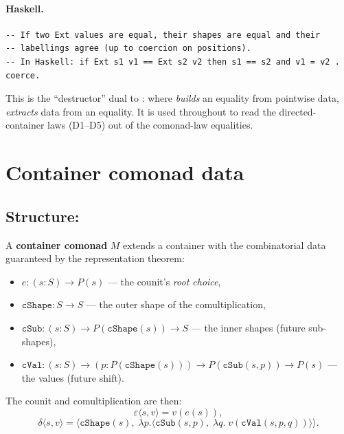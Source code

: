 \documentclass[11pt,a4paper]{article}
\begin{document}
\paragraph{Haskell.}
\begin{lstlisting}[style=haskell]
-- If two Ext values are equal, their shapes are equal and their
-- labellings agree (up to coercion on positions).
-- In Haskell: if Ext s1 v1 == Ext s2 v2 then s1 == s2 and v1 = v2 . coerce.
\end{lstlisting}

\begin{fidelitynote}
This is the ``destructor'' dual to : where 
\emph{builds} an equality from pointwise data,  \emph{extracts}
data from an equality.  It is used throughout to read the directed-container
laws (D1--D5) out of the comonad-law equalities.
\end{fidelitynote}


\section{Container comonad data}

\subsection{Structure: }

\begin{defn}
A \textbf{container comonad} $M$ extends a container with the combinatorial
data guaranteed by the representation theorem:
\begin{itemize}
  \item $e : (s : S) \to P(s)$ --- the counit's \emph{root choice},
  \item $\mathtt{cShape} : S \to S$ --- the outer shape of the comultiplication,
  \item $\mathtt{cSub} : (s : S) \to P(\mathtt{cShape}(s)) \to S$ ---
    the inner shapes (future sub-shapes),
  \item $\mathtt{cVal} : (s : S) \to (p : P(\mathtt{cShape}(s))) \to
    P(\mathtt{cSub}(s, p)) \to P(s)$ --- the values (future shift).
\end{itemize}
The counit and comultiplication are then:
\[
  \varepsilon\langle s, v \rangle = v(e(s)),
\]
\[
  \delta\langle s, v \rangle =
  \bigl\langle \mathtt{cShape}(s),\;
    \lambda p.\langle \mathtt{cSub}(s,p),\;
      \lambda q.\; v(\mathtt{cVal}(s,p,q))\rangle
  \bigr\rangle.
\]
\end{defn}
\end{document}

